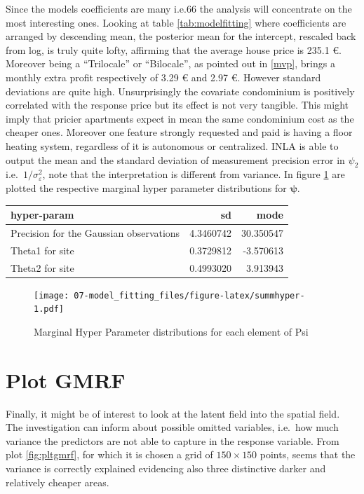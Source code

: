 \documentclass[
  12pt,
  a4paper,
  oneside]{book}
\theoremstyle{definition}
\theoremstyle{definition}
\theoremstyle{definition}
\theoremstyle{remark}
\begin{document}
Since the models coefficients are many i.e.66 the analysis will concentrate on the most interesting ones. Looking at table \ref{tab:modelfitting} where coefficients are arranged by descending mean, the posterior mean for the intercept, rescaled back from log, is truly quite lofty, affirming that the average house price is 235.1 €.
Moreover being a ``Trilocale'' or ``Bilocale'', as pointed out in \ref{mvp}, brings a monthly extra profit respectively of 3.29 € and 2.97 €. However standard deviations are quite high.
Unsurprisingly the covariate condominium is positively correlated with the response price but its effect is not very tangible. This might imply that pricier apartments expect in mean the same condominium cost as the cheaper ones.
Moreover one feature strongly requested and paid is having a floor heating system, regardless of it is autonomous or centralized.
INLA is able to output the mean and the standard deviation of measurement precision error in \(\psi_2\) i.e.~\(1 / \sigma_{\varepsilon}^{2}\), note that the interpretation is different from variance. In figure \ref{fig:summhyper} are plotted the respective marginal hyper parameter distributions for \(\boldsymbol\psi\).

\begin{tabular}{l|r|r}
\hline
hyper-param & sd & mode\\
\hline
Precision for the Gaussian observations & 4.3460742 & 30.350547\\
\hline
Theta1 for site & 0.3729812 & -3.570613\\
\hline
Theta2 for site & 0.4993020 & 3.913943\\
\hline
\end{tabular}

\begin{figure}
\centering
\texttt{[image: 07-model\_fitting\_files/figure-latex/summhyper-1.pdf]}
\caption{\label{fig:summhyper}Marginal Hyper Parameter distributions for each element of Psi}
\end{figure}

\hypertarget{plot-gmrf}{%
\section{Plot GMRF}\label{plot-gmrf}}

Finally, it might be of interest to look at the latent field into the spatial field. The investigation can inform about possible omitted variables, i.e.~how much variance the predictors are not able to capture in the response variable. From plot \ref{fig:pltgmrf}, for which it is chosen a grid of \(150 \times 150\) points, seems that the variance is correctly explained evidencing also three distinctive darker and relatively cheaper areas.
\end{document}
